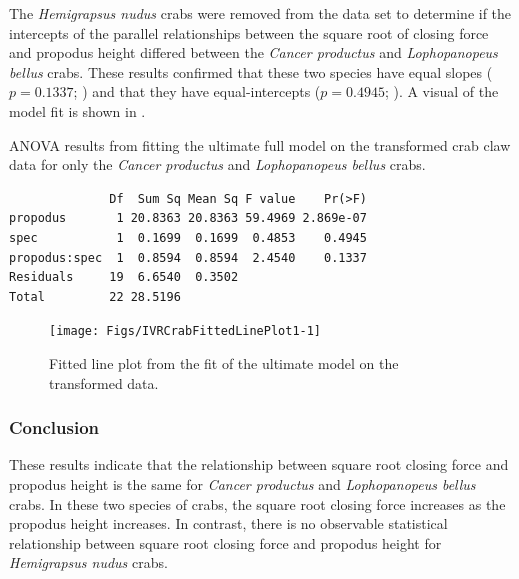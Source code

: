\documentclass[10pt,openany]{book}\usepackage[]{graphicx}\usepackage[]{color}
\makeatletter
\newenvironment{kframe}{%
 \def\at@end@of@kframe{}%
 \ifinner\ifhmode%
  \def\at@end@of@kframe{\end{minipage}}%
  \begin{minipage}{\columnwidth}%
 \fi\fi%
 \def\FrameCommand##1{\hskip\@totalleftmargin \hskip-\fboxsep
 \colorbox{shadecolor}{##1}\hskip-\fboxsep
     \hskip-\linewidth \hskip-\@totalleftmargin \hskip\columnwidth}%
 \MakeFramed {\advance\hsize-\width
   \@totalleftmargin\z@ \linewidth\hsize
   \@setminipage}}%
 {\par\unskip\endMakeFramed%
 \at@end@of@kframe}
\newenvironment{knitrout}{}{} %
\makeatother
\begin{document}
The \emph{Hemigrapsus nudus} crabs were removed from the data set to determine if the intercepts of the parallel relationships between the square root of closing force and propodus height differed between the \emph{Cancer productus} and \emph{Lophopanopeus bellus} crabs.  These results confirmed that these two species have equal slopes ($p=0.1337$; ) and that they have equal-intercepts ($p=0.4945$; ).  A visual of the model fit is shown in .

\begin{table}[h]
  \centering
  \caption{ANOVA results from fitting the ultimate full model on the transformed crab claw data for only the \emph{Cancer productus} and \emph{Lophopanopeus bellus} crabs.}\label{tab:IVRCrabTests2}
\begin{knitrout}
\color{fgcolor}\begin{kframe}
\begin{verbatim}
              Df  Sum Sq Mean Sq F value    Pr(>F)
propodus       1 20.8363 20.8363 59.4969 2.869e-07
spec           1  0.1699  0.1699  0.4853    0.4945
propodus:spec  1  0.8594  0.8594  2.4540    0.1337
Residuals     19  6.6540  0.3502                  
Total         22 28.5196                          
\end{verbatim}
\end{kframe}
\end{knitrout}
\end{table}

\begin{knitrout}
\color{fgcolor}\begin{figure}[h]

{\centering \texttt{[image: Figs/IVRCrabFittedLinePlot1-1]} 

}

\caption[Fitted line plot from the fit of the ultimate model on the transformed data]{Fitted line plot from the fit of the ultimate model on the transformed data.}\label{fig:IVRCrabFittedLinePlot1}
\end{figure}


\end{knitrout}

\subsubsection*{Conclusion}
These results indicate that the relationship between square root closing force and propodus height is the same for \emph{Cancer productus} and \emph{Lophopanopeus bellus} crabs.  In these two species of crabs, the square root closing force increases as the propodus height increases.  In contrast, there is no observable statistical relationship between square root closing force and propodus height for \emph{Hemigrapsus nudus} crabs.
\end{document}
